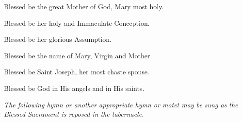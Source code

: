 Blessed be the great Mother of God, Mary most holy.

Blessed be her holy and Immaculate Conception.

Blessed be her glorious Assumption.

Blessed be the name of Mary, Virgin and Mother.

Blessed be Saint Joseph, her most chaste spouse.

Blessed be God in His angels and in His saints.

\bigskip

\centerline{}

\goodbreak
\bigskip
\eject


\medskip

{\noindent \it The following hymn or another appropriate hymn or motet may be sung as the Blessed Sacrament is reposed in the tabernacle.}

\medskip



